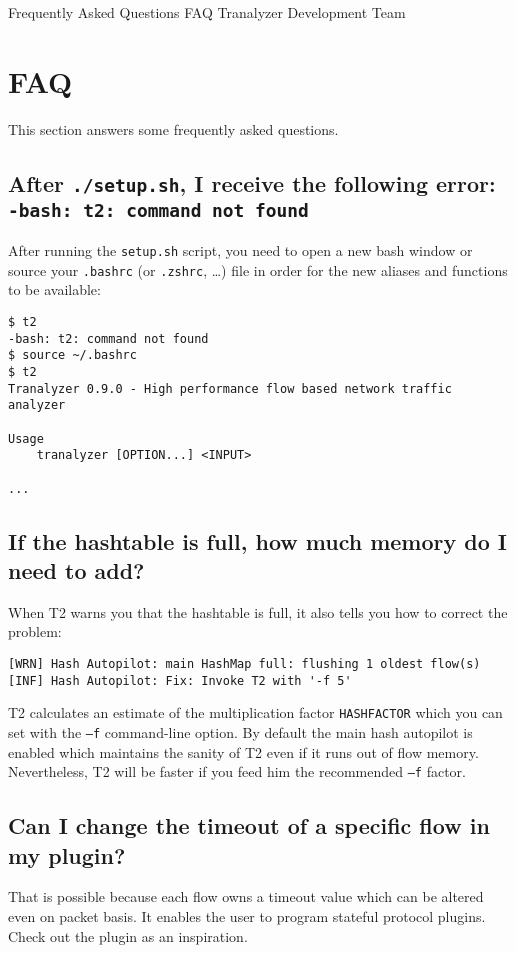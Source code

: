 \documentclass[documentation]{subfiles}
\begin{document}
\trantitle
    {Frequently Asked Questions}
    {FAQ} %
    {Tranalyzer Development Team} %

\section{FAQ}
This section answers some frequently asked questions.

\subsection{After {\tt ./setup.sh}, I receive the following error: {\tt -bash: t2: command not found}}

After running the {\tt setup.sh} script, you need to open a new bash window or source your {\tt .bashrc} (or {\tt .zshrc}, \ldots) file in order for the new aliases and functions to be available:

\begin{verbatim}
$ t2
-bash: t2: command not found
$ source ~/.bashrc
$ t2
Tranalyzer 0.9.0 - High performance flow based network traffic analyzer

Usage
    tranalyzer [OPTION...] <INPUT>

...
\end{verbatim}

\subsection{If the hashtable is full, how much memory do I need to add?}
When T2 warns you that the hashtable is full, it also tells you how to correct the problem:
\begin{center}
    \begin{BVerbatim}
[WRN] Hash Autopilot: main HashMap full: flushing 1 oldest flow(s)
[INF] Hash Autopilot: Fix: Invoke T2 with '-f 5'
    \end{BVerbatim}
\end{center}
T2 calculates an estimate of the multiplication factor {\tt HASHFACTOR} which you can set with the {\tt --f} command-line option.
By default the main hash autopilot is enabled which maintains the sanity of T2 even if it runs out of flow memory.
Nevertheless, T2 will be faster if you feed him the recommended {\tt --f} factor.

\subsection{Can I change the timeout of a specific flow in my plugin?}
That is possible because each flow owns a timeout value which can be altered even on packet basis.
It enables the user to program stateful protocol plugins.
Check out the  plugin as an inspiration.
\end{document}
